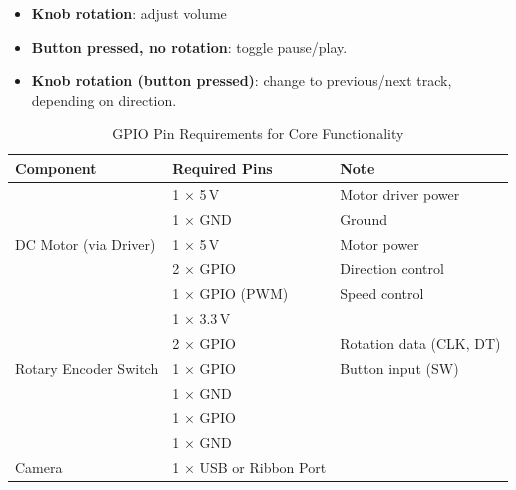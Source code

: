                 \begin{itemize}
                    \item \textbf{Knob rotation}: adjust volume
                    \item \textbf{Button pressed, no rotation}: toggle pause/play.
                    \item \textbf{Knob rotation (button pressed)}: change to previous/next track, depending on direction.
                \end{itemize}
    
                \begin{table}[htbp]
                    \centering
                    \caption{GPIO Pin Requirements for Core Functionality}
                    \label{tab:coreGPIOPins}
                    \begin{tabular}{|l|l|l|}
                        \hline
                        \textbf{Component} & \textbf{Required Pins} & \textbf{Note}\\ \hline
                        \multirow{5}{*}{DC Motor (via Driver)} & 1 × 5\,V & Motor driver power \\ \cline{2-3}
                                                               & 1 × GND & Ground \\ \cline{2-3}
                                                               & 1 × 5\,V & Motor power \\ \cline{2-3}
                                                               & 2 × GPIO & Direction control \\ \cline{2-3}
                                                               & 1 × GPIO (PWM) & Speed control \\ \hline
                        \multirow{5}{*}{Rotary Encoder Switch} & 1 × 3.3\,V & \\ \cline{2-3}
                                                               & 2 × GPIO& Rotation data (CLK, DT)\\ \cline{2-3}
                                                               & 1 × GPIO & Button input (SW)\\ \cline{2-3}
                                                               & 1 × GND & \\ \hline
                        \multirow{2}{*}{Button (Camera Trigger)} & 1 × GPIO & \\ \cline{2-3}
                                                                 & 1 × GND & \\ \hline
                        Camera & 1 × USB or Ribbon Port & \\ \hline
                    \end{tabular}
                \end{table}
    
